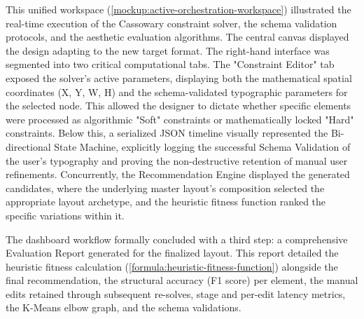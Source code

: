 \begin{refsection}
This unified workspace (\ref{mockup:active-orchestration-workspace}) illustrated the real-time execution of the Cassowary constraint solver, the schema validation protocols, and the aesthetic evaluation algorithms. The central canvas displayed the design adapting to the new target format. The right-hand interface was segmented into two critical computational tabs. The "Constraint Editor" tab exposed the solver's active parameters, displaying both the mathematical spatial coordinates (X, Y, W, H) and the schema-validated typographic parameters for the selected node. This allowed the designer to dictate whether specific elements were processed as algorithmic "Soft" constraints or mathematically locked "Hard" constraints. Below this, a serialized JSON timeline visually represented the Bi-directional State Machine, explicitly logging the successful Schema Validation of the user's typography and proving the non-destructive retention of manual user refinements. Concurrently, the Recommendation Engine displayed the generated candidates, where the underlying master layout's composition selected the appropriate layout archetype, and the heuristic fitness function ranked the specific variations within it.

The dashboard workflow formally concluded with a third step: a comprehensive Evaluation Report generated for the finalized layout. This report detailed the heuristic fitness calculation (\ref{formula:heuristic-fitness-function}) alongside the final recommendation, the structural accuracy (F1 score) per element, the manual edits retained through subsequent re-solves, stage and per-edit latency metrics, the K-Means elbow graph, and the schema validations.   


\end{refsection}
